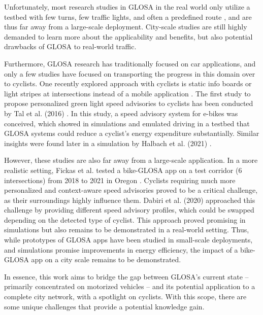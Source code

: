 Unfortunately, most research studies in GLOSA in the real world only utilize a testbed with few turns, few traffic lights, and often a predefined route \cite{iglesias_i2v_2008, schweiger_elisatm_2011, raubitschek_predictive_2011, koukoumidis_signalguru_2011, koukoumidis_leveraging_2012, hao_eco-approach_2019, fickas_fast_2019, chen_developing_2022}, and are thus far away from a large-scale deployment. City-scale studies are still highly demanded to learn more about the applicability and benefits, but also potential drawbacks of GLOSA to real-world traffic.

Furthermore, GLOSA research has traditionally focused on car applications, and only a few studies have focused on transporting the progress in this domain over to cyclists. One recently explored approach with cyclists is static info boards or light stripes at intersections instead of a mobile application \cite{lu_enhancement_2018}. The first study to propose personalized green light speed advisories to cyclists has been conducted by Tal et al. (2016) \cite{tal_vehicular-communications-based_2016}. In this study, a speed advisory system for e-bikes was conceived, which showed in simulations and emulated driving in a testbed that GLOSA systems could reduce a cyclist's energy expenditure substantially. Similar insights were found later in a simulation by Halbach et al. (2021) \cite{halbach_cooperative_2021}. 

However, these studies are also far away from a large-scale application. In a more realistic setting, Fickas et al. tested a bike-GLOSA app on a test corridor (6 intersections) from 2018 to 2021 in Oregon \cite{fickas_project_2018, fickas_riding_2019, fickas_fast_2019, fickas_green_2021, fickas_using_2021, fickas_data_2021}. Cyclists requiring much more personalized and context-aware speed advisories proved to be a critical challenge, as their surroundings highly influence them. Dabiri et al. (2020) \cite{dabiri_optimized_2020} approached this challenge by providing different speed advisory profiles, which could be swapped depending on the detected type of cyclist. This approach proved promising in simulations but also remains to be demonstrated in a real-world setting. Thus, while prototypes of GLOSA apps have been studied in small-scale deployments, and simulations promise improvements in energy efficiency, the impact of a bike-GLOSA app on a city scale remains to be demonstrated.

In essence, this work aims to bridge the gap between GLOSA's current state -- primarily concentrated on motorized vehicles -- and its potential application to a complete city network, with a spotlight on cyclists. With this scope, there are some unique challenges that provide a potential knowledge gain.

